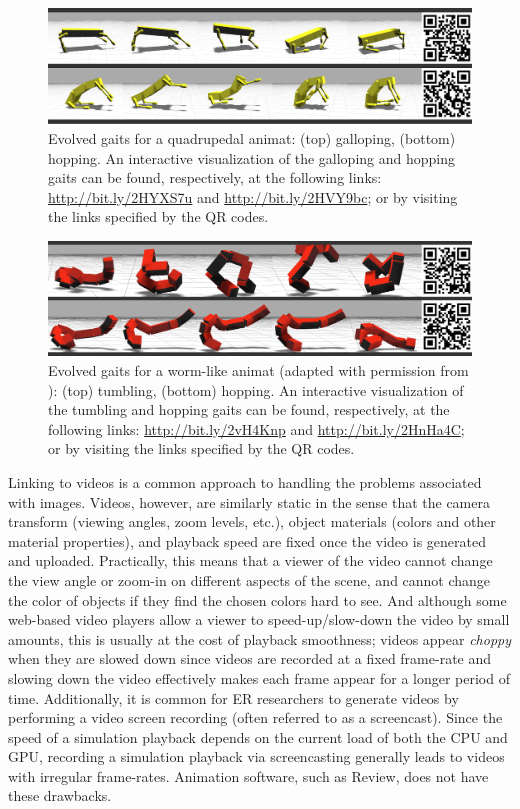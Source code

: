 \begin{figure}[htb!]
\centering
\includegraphics[width=\textwidth]{figures/quadruped.png}
\caption{Evolved gaits for a quadrupedal animat: (top) galloping, (bottom) hopping. An interactive visualization of the galloping and hopping gaits can be found, respectively, at the following links: \url{http://bit.ly/2HYXS7u} and \url{http://bit.ly/2HVY9bc}; or by visiting the links specified by the QR codes.}
\label{fig:quad_gaits}
\end{figure}

\begin{figure}[htb!]
\centering
\includegraphics[width=\textwidth]{figures/worm.png}
\caption{Evolved gaits for a worm-like animat (adapted with permission from \textcite{Moore.2017.GECCO.Animat}): (top) tumbling, (bottom) hopping. An interactive visualization of the tumbling and hopping gaits can be found, respectively, at the following links: \url{http://bit.ly/2vH4Knp} and \url{http://bit.ly/2HnHa4C}; or by visiting the links specified by the QR codes.}
\label{fig:worm_gaits}
\end{figure}


Linking to videos is a common approach to handling the problems associated with images.
%
Videos, however, are similarly static in the sense that the camera transform (viewing angles, zoom levels, etc.), object materials (colors and other material properties), and playback speed are fixed once the video is generated and uploaded.
%
Practically, this means that a viewer of the video cannot change the view angle or zoom-in on different aspects of the scene, and cannot change the color of objects if they find the chosen colors hard to see.
%
And although some web-based video players allow a viewer to speed-up/slow-down the video by small amounts, this is usually at the cost of playback smoothness; videos appear \emph{choppy} when they are slowed down since videos are recorded at a fixed frame-rate and slowing down the video effectively makes each frame appear for a longer period of time.
%
Additionally, it is common for ER researchers to generate videos by performing a video screen recording (often referred to as a screencast).
%
Since the speed of a simulation playback depends on the current load of both the CPU and GPU, recording a simulation playback via screencasting generally leads to videos with irregular frame-rates.
%
Animation software, such as Review, does not have these drawbacks.




